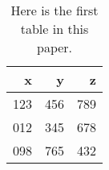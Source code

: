 \begin{table}[tbp]
    \caption{Here is the first table in this paper.}
    \label{tab:tabl}
    \centering
    \begin{tabular}{rrr}
    \toprule
    x & y & z \\
    \midrule
    123 & 456 & 789 \\
    012 & 345 & 678 \\
    098 & 765 & 432 \\
    \bottomrule
    \end{tabular}
    \end{table}